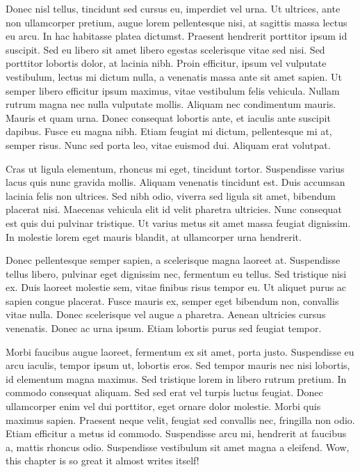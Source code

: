 Donec nisl tellus, tincidunt sed cursus eu, imperdiet vel urna. Ut ultrices,
ante non ullamcorper pretium, augue lorem pellentesque nisi, at sagittis massa
lectus eu arcu. In hac habitasse platea dictumst. Praesent hendrerit porttitor
ipsum id suscipit. Sed eu libero sit amet libero egestas scelerisque vitae sed
nisi. Sed porttitor lobortis dolor, at lacinia nibh. Proin efficitur, ipsum vel
vulputate vestibulum, lectus mi dictum nulla, a venenatis massa ante sit amet
sapien. Ut semper libero efficitur ipsum maximus, vitae vestibulum felis
vehicula. Nullam rutrum magna nec nulla vulputate mollis. Aliquam nec
condimentum mauris. Mauris et quam urna. Donec consequat lobortis ante, et
iaculis ante suscipit dapibus. Fusce eu magna nibh. Etiam feugiat mi dictum,
pellentesque mi at, semper risus. Nunc sed porta leo, vitae euismod dui. Aliquam
erat volutpat.

Cras ut ligula elementum, rhoncus mi eget, tincidunt tortor. Suspendisse varius
lacus quis nunc gravida mollis. Aliquam venenatis tincidunt est. Duis accumsan
lacinia felis non ultrices. Sed nibh odio, viverra sed ligula sit amet, bibendum
placerat nisi. Maecenas vehicula elit id velit pharetra ultricies. Nunc
consequat est quis dui pulvinar tristique. Ut varius metus sit amet massa
feugiat dignissim. In molestie lorem eget mauris blandit, at ullamcorper urna
hendrerit.

Donec pellentesque semper sapien, a scelerisque magna laoreet at. Suspendisse
tellus libero, pulvinar eget dignissim nec, fermentum eu tellus. Sed tristique
nisi ex. Duis laoreet molestie sem, vitae finibus risus tempor eu. Ut aliquet
purus ac sapien congue placerat. Fusce mauris ex, semper eget bibendum non,
convallis vitae nulla. Donec scelerisque vel augue a pharetra. Aenean ultricies
cursus venenatis. Donec ac urna ipsum. Etiam lobortis purus sed feugiat tempor.

Morbi faucibus augue laoreet, fermentum ex sit amet, porta justo. Suspendisse eu
arcu iaculis, tempor ipsum ut, lobortis eros. Sed tempor mauris nec nisi
lobortis, id elementum magna maximus. Sed tristique lorem in libero rutrum
pretium. In commodo consequat aliquam. Sed sed erat vel turpis luctus
feugiat. Donec ullamcorper enim vel dui porttitor, eget ornare dolor
molestie. Morbi quis maximus sapien. Praesent neque velit, feugiat sed convallis
nec, fringilla non odio. Etiam efficitur a metus id commodo. Suspendisse arcu
mi, hendrerit at faucibus a, mattis rhoncus odio. Suspendisse vestibulum sit
amet magna a eleifend. Wow, this chapter is so great it almost writes itself!
